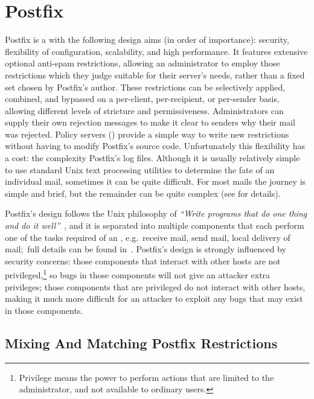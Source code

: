 \section{Postfix}

\label{postfix background}

Postfix is a  with the following design aims (in order of
importance): security, flexibility of configuration, scalability, and high
performance.  It features extensive optional anti-spam restrictions,
allowing an administrator to employ those restrictions which they judge
suitable for their server's needs, rather than a fixed set chosen by
Postfix's author.  These restrictions can be selectively applied, combined,
and bypassed on a per-client, per-recipient, or per-sender basis, allowing
different levels of stricture and permissiveness.  Administrators can
supply their own rejection messages to make it clear to senders why their
mail was rejected.  Policy servers () provide a
simple way to write new restrictions without having to modify Postfix's
source code.  Unfortunately this flexibility has a cost: the complexity
Postfix's log files.  Although it is usually relatively simple to use
standard Unix text processing utilities to determine the fate of an
individual mail, sometimes it can be quite difficult.  For most mails the
journey is simple and brief, but the remainder can be quite complex (see
 for details).

Postfix's design follows the Unix philosophy of \textit{``Write programs
that do one thing and do it well''\/}~\cite{unix-philosophy}, and it is
separated into multiple components that each perform one of the tasks
required of an , e.g.\ receive mail, send mail, local delivery
of mail;\ full details can be found in~\cite{postfix-overview}.  Postfix's
design is strongly influenced by security concerns: those components that
interact with other hosts are not privileged,\footnote{Privilege means the
power to perform actions that are limited to the administrator, and not
available to ordinary users.} so bugs in those components will not give an
attacker extra privileges; those components that are privileged do not
interact with other hosts, making it much more difficult for an attacker to
exploit any bugs that may exist in those components.

\subsection{Mixing And Matching Postfix Restrictions}

